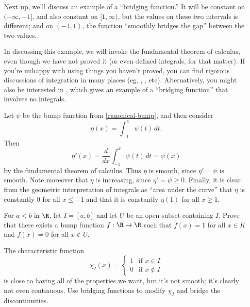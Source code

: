 Next up, we'll discuss an example of a ``bridging function.'' It will be constant on $(-\infty, -1]$, and also constant on $[1, \infty)$, but the values on these two intervals is different; and on $(-1,1)$, the function ``smoothly bridges the gap'' between the two values. 

In discussing this example, we will invoke the fundamental theorem of calculus, even though we have not proved it (or even defined integrals, for that matter). If you're unhappy with using things you haven't proved, you can find rigorous discussions of integration in many places (eg, \cite[chapter 5]{protter-morrey}, \cite[chapter 6]{rudin}, etc). Alternatively, you might also be interested in \cite[chapter 3, example 12]{counterexamples}, which gives an example of a ``bridging function'' that involves no integrals. 

\begin{example} \label{integral-canonical-bump}
	Let $\psi$ be the bump function from \cref{canonical-bump}, and then consider 
	\[ \eta(x) = \int_{-1}^x \psi(t)\, dt. \]
	Then 
	\[ \eta'(x) = \frac{d}{dx} \int_{-1}^x \psi(t)\, dt = \psi(x) \]
	by the fundamental theorem of calculus. Thus $\eta$ is smooth, since $\eta' = \psi$ is smooth. Note moreover that $\eta$ is increasing, since $\eta' = \psi \geq 0$. Finally, it is clear from the geometric interpretation of integrals as ``area under the curve'' that $\eta$ is constantly 0 for all $x \leq -1$ and that it is constantly $\eta(1)$ for all $x \geq 1$. 
\end{example}

\begin{exercise} \label{constant-compact-zero-outside-neighborhood}
	For $a < b$ in $\R$, let $I = [a, b]$ and let $U$ be an open subset containing $I$. Prove that there exists a bump function $f : \R \to \R$ such that $f(x) = 1$ for all $x \in K$ and $f(x) = 0$ for all $x \notin U$. \begin{hint} 
	The characteristic function \[ \chi_I(x) = \begin{cases} 1 & \text{if } x \in I \\ 0 & \text{if } x \notin I \end{cases} \]
	is close to having all of the properties we want, but it's not smooth; it's clearly not even continuous. Use bridging functions to modify $\chi_I$ and bridge the discontinuities. \end{hint}
\end{exercise}